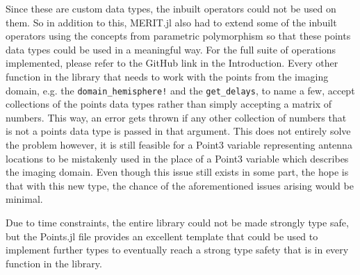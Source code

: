 Since these are custom data types, the inbuilt operators could not be used on them. So in addition to this, MERIT.jl
also had to extend some of the inbuilt operators using the concepts from parametric polymorphism so that these points
data types could be used in a meaningful way. For the full suite of operations implemented, please refer to the GitHub
link in the Introduction. Every other function in the library that needs to work with the points from the imaging domain,
e.g. the \lstinline[language=Julia]{domain_hemisphere!} and the \lstinline[language=Julia]{get_delays}, to name a few,
accept collections of the points data types rather than simply accepting a matrix of numbers. This way, an error gets
thrown if any other collection of numbers that is not a points data type is passed in that argument. This does not
entirely solve the problem however, it is still feasible for a Point3 variable representing antenna locations to be
mistakenly used in the place of a Point3 variable which describes the imaging domain. Even though this issue still
exists in some part, the hope is that with this new type, the chance of the aforementioned issues arising would be
minimal. 


Due to time constraints, the entire library could not be made strongly type safe, but the Points.jl file
provides an excellent template that could be used to implement further types to eventually reach a strong type safety
that is in every function in the library.

